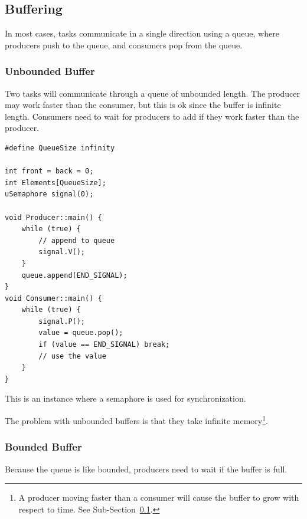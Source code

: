             \subsection{Buffering} %
            \label{sub:buffering}
                In most cases, tasks communicate in a single direction using a queue, where producers push to the queue, and consumers pop from the queue.
                \subsubsection{Unbounded Buffer} %
                \label{ssub:unbounded_buffer}
                    Two tasks will communicate through a queue of unbounded length.
                    The producer may work faster than the consumer, but this is ok since the buffer is infinite length.
                    Consumers need to wait for producers to add if they work faster than the producer.
                    \begin{lstlisting}
#define QueueSize infinity

int front = back = 0;
int Elements[QueueSize];
uSemaphore signal(0);

void Producer::main() {
    while (true) {
        // append to queue
        signal.V();
    }
    queue.append(END_SIGNAL);
}
void Consumer::main() {
    while (true) {
        signal.P();
        value = queue.pop();
        if (value == END_SIGNAL) break;
        // use the value
    }
}
                    \end{lstlisting}
                    This is an instance where a semaphore is used for synchronization.

                    The problem with unbounded buffers is that they take infinite memory\footnote{A producer moving faster than a consumer will cause the buffer to grow with respect to time. See Sub-Section~\ref{sub:buffering}.}.
                \subsubsection{Bounded Buffer} %
                \label{ssub:bounded_buffer}
                    Because the queue is like bounded, producers need to wait if the buffer is full.

